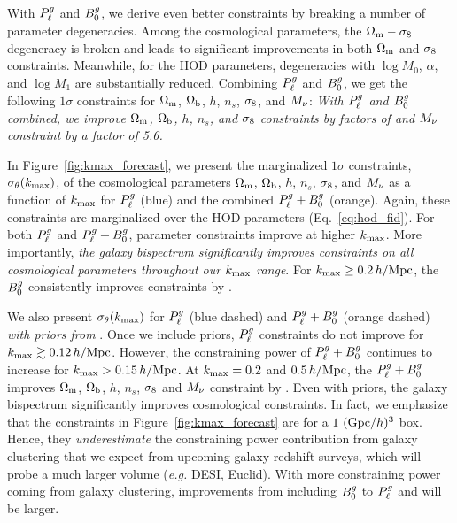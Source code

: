 With $P^g_{\ell}$ and $B^g_0$, we derive even better constraints by breaking a number
of parameter degeneracies. Among the cosmological parameters, the $\Omega_{\rm m}-\sigma_8$ 
degeneracy is broken and leads to significant improvements in both $\Omega_{\rm m}$ and 
$\sigma_8$ constraints. Meanwhile, for the HOD parameters, degeneracies with 
$\log M_0$, $\alpha$, and $\log M_1$ are substantially reduced. 
Combining $P^g_{\ell}$ and $B^g_0$, we get the following $1\sigma$ constraints for 
 $\Omega_{\rm m}$, $\Omega_{\rm b}$, $h$, $n_s$, $\sigma_8$, and $M_\nu$: 
{\em With $P^g_{\ell}$ and $B^g_0$ combined, we improve $\Omega_{\rm m}$, $\Omega_{\rm b}$, $h$,
$n_s$, and $\sigma_8$ constraints by factors of 
and $M_\nu$ constraint by a factor of 5.6.}

In Figure~\ref{fig:kmax_forecast}, we present the marginalized $1\sigma$
constraints, $\sigma_\theta(k_{\rm max})$, of the cosmological parameters $\Omega_{\rm m}$,
$\Omega_{\rm b}$, $h$, $n_s$, $\sigma_8$, and $M_\nu$ as a function of $k_{\rm max}$ for $P^g_{\ell}$
(blue) and the combined $P^g_{\ell} + B^g_0$ (orange). Again, these constraints are
marginalized over the \cite{zheng2007} HOD parameters (Eq.~\ref{eq:hod_fid}). 
For both $P^g_{\ell}$ and $P^g_{\ell} + B^g_0$, parameter constraints improve at higher
$k_{\rm max}$. More importantly, {\em the galaxy bispectrum significantly 
improves constraints on all cosmological parameters throughout our $k_{\rm max}$
range}. For $k_{\rm max} \ge 0.2\,h/\mathrm{Mpc}$, the $B^g_0$ consistently improves 
constraints by .

We also present $\sigma_\theta(k_{\rm max})$ for $P^g_{\ell}$ (blue dashed) and $P^g_{\ell} + B^g_0$ 
(orange dashed) {\em with priors from \planck}. Once we include \planck priors,
$P^g_{\ell}$ constraints do not improve for $k_{\rm max} \gtrsim 0.12\,h/\mathrm{Mpc}$. However, the 
constraining power of $P^g_{\ell} + B^g_0$ continues to increase for $k_{\rm max} > 0.15\,h/\mathrm{Mpc}$. 
At $k_{\rm max} = 0.2$ and $0.5\,h/\mathrm{Mpc}$, the $P^g_{\ell} + B^g_0$ improves  
$\Omega_{\rm m}$, $\Omega_{\rm b}$, $h$, $n_s$, $\sigma_8$ and $M_\nu$ constraint by . 
Even with \planck priors, the galaxy bispectrum significantly improves cosmological 
constraints. In fact, we emphasize that the constraints in Figure~\ref{fig:kmax_forecast} 
are for a $1~({\rm Gpc}/h)^3$ box. Hence, they {\em underestimate} the 
constraining power contribution from galaxy clustering that we expect from upcoming
galaxy redshift surveys, which will probe a much larger volume (\emph{e.g.} DESI, Euclid). 
With more constraining power coming from galaxy clustering, improvements from
including $B^g_0$ to $P^g_{\ell}$ and \planck will be larger. 

